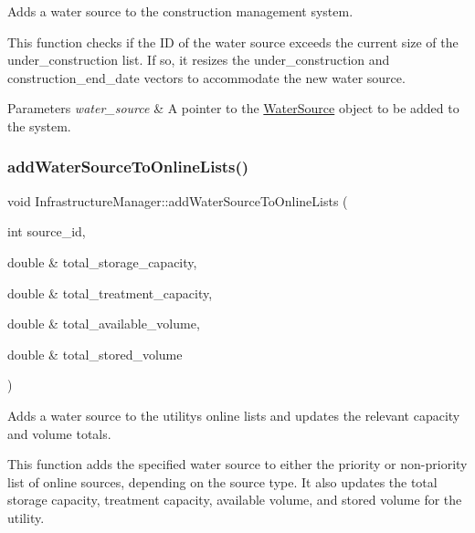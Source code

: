 Adds a water source to the construction management system. 

This function checks if the ID of the water source exceeds the current size of the {\ttfamily under\+\_\+construction} list. If so, it resizes the {\ttfamily under\+\_\+construction} and {\ttfamily construction\+\_\+end\+\_\+date} vectors to accommodate the new water source.


\begin{DoxyParams}{Parameters}
{\em water\+\_\+source} & A pointer to the {\ttfamily \mbox{\hyperlink{classWaterSource}{Water\+Source}}} object to be added to the system. \\
\hline
\end{DoxyParams}
\mbox{\label{classInfrastructureManager_ab66bdc91a6f60c6aea6ce0bf179df913}} 
\subsubsection{\texorpdfstring{add\+Water\+Source\+To\+Online\+Lists()}{addWaterSourceToOnlineLists()}}
{\footnotesize\ttfamily void Infrastructure\+Manager\+::add\+Water\+Source\+To\+Online\+Lists (\begin{DoxyParamCaption}\item[{int}]{source\+\_\+id,  }\item[{double \&}]{total\+\_\+storage\+\_\+capacity,  }\item[{double \&}]{total\+\_\+treatment\+\_\+capacity,  }\item[{double \&}]{total\+\_\+available\+\_\+volume,  }\item[{double \&}]{total\+\_\+stored\+\_\+volume }\end{DoxyParamCaption})}



Adds a water source to the utility\textquotesingle{}s online lists and updates the relevant capacity and volume totals. 

This function adds the specified water source to either the priority or non-\/priority list of online sources, depending on the source type. It also updates the total storage capacity, treatment capacity, available volume, and stored volume for the utility.


